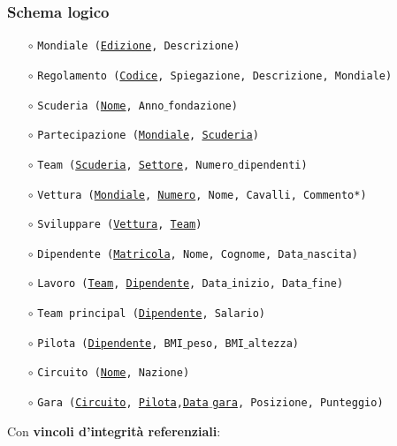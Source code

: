 \subsubsection{Schema logico}
\begin{itemize}
    \item[$\circ$] \texttt{Mondiale (\underline{Edizione}, Descrizione)}
    \item[$\circ$] \texttt{Regolamento (\underline{Codice}, Spiegazione, Descrizione, Mondiale)}
    \item[$\circ$] \texttt{Scuderia (\underline{Nome}, Anno$\_$fondazione)}
    \item[$\circ$] \texttt{Partecipazione (\underline{Mondiale}, \underline{Scuderia})}
    \item[$\circ$] \texttt{Team (\underline{Scuderia}, \underline{Settore}, Numero$\_$dipendenti)}
    \item[$\circ$] \texttt{Vettura (\underline{Mondiale}, \underline{Numero}, Nome, Cavalli, Commento*)}
    \item[$\circ$] \texttt{Sviluppare (\underline{Vettura}, \underline{Team})}
    \item[$\circ$] \texttt{Dipendente (\underline{Matricola}, Nome, Cognome, Data$\_$nascita)}
    \item[$\circ$] \texttt{Lavoro (\underline{Team}, \underline{Dipendente}, Data$\_$inizio, Data$\_$fine)}
    \item[$\circ$] \texttt{Team principal (\underline{Dipendente}, Salario)}
    \item[$\circ$] \texttt{Pilota (\underline{Dipendente}, BMI$\_$peso, BMI$\_$altezza)}
    \item[$\circ$] \texttt{Circuito (\underline{Nome}, Nazione)}
    \item[$\circ$] \texttt{Gara (\underline{Circuito}, \underline{Pilota},\underline{Data$\_$gara}, Posizione, Punteggio)}
\end{itemize}

\vspace*{10 pt}
\noindent Con \textbf{vincoli d'integrità referenziali}:

